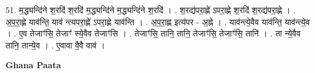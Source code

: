 \documentclass[17pt]{extarticle}
\begin{document}
51. म॒द्ध्यन्दि॑ने श॒रदि॑ श॒रदि॑ म॒द्ध्यन्दि॑ने म॒द्ध्यन्दि॑ने श॒रदि॑ । . श॒रद्य॑परा॒ह्णे॑ ऽपरा॒ह्णे श॒रदि॑ श॒रद्य॑परा॒ह्णे । . अ॒प॒रा॒ह्णे याव॑न्ति॒ याव॑ न्त्यपरा॒ह्णे॑ ऽपरा॒ह्णे याव॑न्ति । . अ॒प॒रा॒ह्ण इत्य॑पर - अ॒ह्ने । . याव॑न्त्ये॒वैव याव॑न्ति॒ याव॑न्त्ये॒व । . ए॒व तेजाꣳ॑सि॒ तेजाꣳ॑ स्ये॒वैव तेजाꣳ॑सि । . तेजाꣳ॑सि॒ तानि॒ तानि॒ तेजाꣳ॑सि॒ तेजाꣳ॑सि॒ तानि॑ । . ता न्ये॒वैव तानि॒ तान्ये॒व । . ए॒वावा वै॒वै वाव॑ । \newline

\textbf{Ghana Paata } \newline
\end{document}
